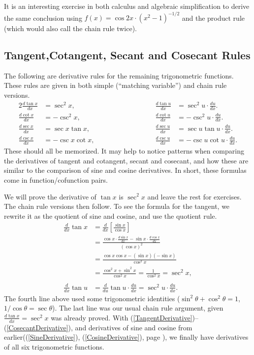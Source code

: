 \eex
It is an interesting exercise in both calculus and
algebraic simplification to derive the same conclusion 
using $f(x)=\cos2x\cdot(x^2-1)^{-1/2}$ and the product rule
(which would also call the chain rule twice).
\subsection{Tangent,Cotangent, Secant and Cosecant Rules}
The following are derivative rules for the remaining trigonometric
functions.  These rules are given in both simple
(``matching variable'') and chain rule versions.
\begin{alignat}{2}
\frac{d \tan x}{dx}&=\sec^2x,\qquad\qquad
    &\frac{d\tan u}{dx}&=\sec^2u\cdot\frac{du}{dx}.\label{TangentDerivative}
     \\
\frac{d \cot x}{dx}&=-\csc^2x,\qquad\qquad
    &\frac{d\cot u}{dx}&=-\csc^2u\cdot\frac{du}{dx}.\label{CotangentDerivative}
\\
\frac{d\sec x}{dx}&=\sec x\tan x,&\frac{d\sec u}{dx}&=
                        \sec u\tan u\cdot\frac{du}{dx}.
                  \label{SecantDerivative}\\
\frac{d\csc x}{dx}&=-\csc x\cot x,\qquad\qquad\qquad\qquad&\frac{d\csc u}{dx}&=
                        -\csc u\cot u\cdot\frac{du}{dx}.
                  \label{CosecantDerivative}
     \end{alignat}
These should all be memorized.  It may help to
notice patterns when comparing the derivatives of tangent
and cotangent, secant and cosecant, and how these are similar
to the comparison of sine and cosine derivatives.
In short, these formulas come in function/cofunction pairs.

We will prove the derivative of $\tan x$ is $\sec^2x$ and
leave the rest for exercises.  The chain rule
versions then follow.  To see the formula for the tangent, we
rewrite it as the quotient of sine and cosine, and use the quotient
rule.
\begin{align*}
\frac{d}{dx}\tan x&=\frac{d}{dx}\left[\frac{\sin x}{\cos x}\right]\\
&=\frac{\cos x\cdot\frac{d\sin x}{dx}-\sin x\cdot\frac{d\cos x}{dx}}{(\cos x)^2}\\
&=\frac{\cos x\cos x-(\sin x)(-\sin x)}{\cos^2x}\\
&=\frac{\cos^2x+\sin^2x}{\cos^2x}
=\frac1{\cos^2x}=\sec^2x,\\ \\
\frac{d}{dx}\tan u&=\frac{d}{du}\tan u\cdot\frac{du}{dx}
                  =\sec^2u\cdot\frac{du}{dx}.\end{align*}
The fourth line above used some trigonometric identities
($\sin^2\theta+\cos^2\theta=1$, $1/\cos\theta=\sec\theta$).
The last line was our usual chain rule argument,
given $\frac{d\tan x}{dx}=\sec^2x$ was already proved.
With (\ref{TangentDerivative})--(\ref{CosecantDerivative}),
and derivatives of sine and cosine from earlier((\ref{SineDerivative}), 
(\ref{CosineDerivative}), page \pageref{SineDerivative}),
we finally have derivatives of all six trigonometric functions.

